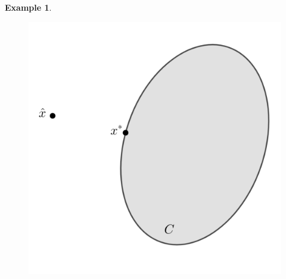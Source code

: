 \documentclass[11pt,reqno]{amsart}
\theoremstyle{plain}
\theoremstyle{definition}
\newtheorem{example}[theorem]{Example}
\begin{document}
{\begin{example}
    \begin{figure}[h]
    \centering
    \begin{minipage}{.5\textwidth}
      \centering
      \includegraphics[height = 1.7 in]{proj.png}
      \label{fig:test1}
    \end{minipage}%
    \end{figure}
\end{example}
}
\end{document}
